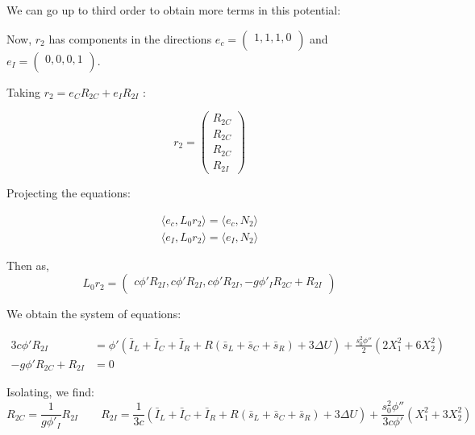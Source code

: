 \documentclass[ENG]{fancynotes}
\begin{document}
We can go up to third order to obtain more terms in this potential:

Now, $r_2$ has components in the directions $e_c = \begin{pmatrix}
1,1,1,0\\
\end{pmatrix}$ and $e_I = \begin{pmatrix}0,0,0,1\\\end{pmatrix}$. 

Taking $r_2 = e_CR_{2C} + e_IR_{2I}$ :

 \[
r_{2} = \begin{pmatrix}R_{2C}\\R_{2C}\\R_{2C}\\R_{2I} \end{pmatrix} 
\]


Projecting the equations:

\begin{equation}
\begin{aligned}
\langle e_c , L_0r_2 \rangle = \langle e_c, N_2\rangle\\[8pt]
\langle e_I , L_0r_2 \rangle = \langle e_I, N_2\rangle
\end{aligned}
\label{eq:secondorder}
\end{equation}

Then as, \[L_0r_2 = \begin{pmatrix}
c\phi'R_{2I},c\phi'R_{2I},c\phi'R_{2I}, -g\phi'_IR_{2C} +R_{2I}\\
\end{pmatrix}\]

We obtain the system of equations:
%

\begin{equation}
\begin{aligned}
3c\phi'R_{2I}  &= \phi'(\bar{I}_L+\bar{I}_C+\bar{I}_R + R(\bar{s}_L+ \bar{s}_C+ \bar{s}_R) +3\Delta U )+ \frac{s_0^2\phi''}{2}\left(2X_1^2+6X_2^2 \right)\\[8pt]
-g\phi'R_{2C} +R_{2I} &= 0
\end{aligned}
\label{eq:}
\end{equation}


Isolating, we find:
\[
R_{2C} = \frac{1}{g\phi'_I}R_{2I} \qquad R_{2I} = \frac{1}{3c}(\bar{I}_L+\bar{I}_C+\bar{I}_R + R(\bar{s}_L+ \bar{s}_C+ \bar{s}_R) +3\Delta U )+ \frac{s_0^2\phi''}{3c\phi'}(X_1^2+3X_2^2)
\]
\end{document}
